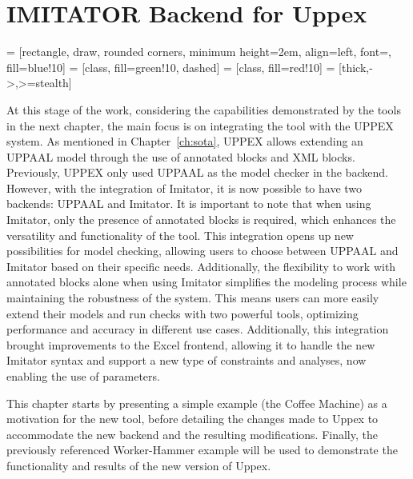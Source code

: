 
\chapter{IMITATOR Backend for Uppex}


\usetikzlibrary{shapes.geometric, arrows, positioning}

 = [rectangle, draw, rounded corners, minimum height=2em, align=left, font=\ttfamily, fill=blue!10]
 = [class, fill=green!10, dashed]
 = [class, fill=red!10]
 = [thick,->,>=stealth]

At this stage of the work, considering the capabilities demonstrated by the tools in the next chapter, the main focus is on integrating the tool with the UPPEX system. As mentioned in Chapter~\ref{ch:sota}, UPPEX allows extending an UPPAAL model through the use of annotated blocks and XML blocks. Previously, UPPEX only used UPPAAL as the model checker in the backend. However, with the integration of Imitator, it is now possible to have two backends: UPPAAL and Imitator. It is important to note that when using Imitator, only the presence of annotated blocks is required, which enhances the versatility and functionality of the tool. This integration opens up new possibilities for model checking, allowing users to choose between UPPAAL and Imitator based on their specific needs. Additionally, the flexibility to work with annotated blocks alone when using Imitator simplifies the modeling process while maintaining the robustness of the system. This means users can more easily extend their models and run checks with two powerful tools, optimizing performance and accuracy in different use cases. Additionally, this integration brought improvements to the Excel frontend, allowing it to handle the new Imitator syntax and support a new type of constraints and analyses, now enabling the use of parameters.

This chapter starts by presenting a simple example (the Coffee Machine) as a motivation for the new tool, before detailing the changes made to Uppex to accommodate the new backend and the resulting modifications. Finally, the previously referenced Worker-Hammer example will be used to demonstrate the functionality and results of the new version of Uppex.

